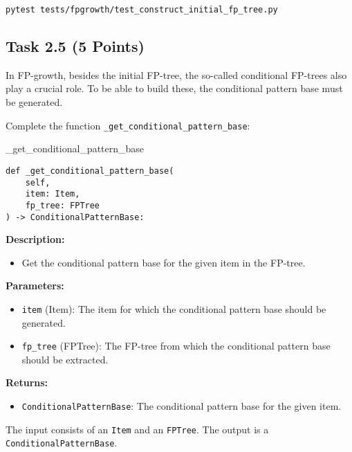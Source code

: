 \documentclass[
english,
smallborders
]{i6prcsht}
\newcommand{\points}[1]{\hfill \color{red}(#1 Points)\color{black}}
\begin{document}
\begin{lstlisting}
pytest tests/fpgrowth/test_construct_initial_fp_tree.py
\end{lstlisting}

\newpage

\subsection*{Task 2.5 \points{5}}

In FP-growth, besides the initial FP-tree, the so-called conditional FP-trees also play a crucial role. To be able to build these, the conditional pattern base must be generated.

Complete the function \texttt{\_get\_conditional\_pattern\_base}:

\vspace*{0.3cm}

\begin{functionbox}{\_get\_conditional\_pattern\_base}
	\begin{lstlisting}[numbers=none]
def _get_conditional_pattern_base(
    self, 
    item: Item, 
    fp_tree: FPTree
) -> ConditionalPatternBase:
\end{lstlisting}
	
	\textbf{Description:}
	\begin{itemize}[leftmargin=*,topsep=0pt]
		\item Get the conditional pattern base for the given item in the FP-tree.
	\end{itemize}
	
	\textbf{Parameters:}
	\begin{itemize}[leftmargin=*,topsep=0pt]
		\item \texttt{item} (Item): The item for which the conditional pattern base should be generated.
		\item \texttt{fp\_tree} (FPTree): The FP-tree from which the conditional pattern base should be extracted.
	\end{itemize}
	
	\textbf{Returns:}
	\begin{itemize}[leftmargin=*,topsep=0pt]
		\item \texttt{ConditionalPatternBase}: The conditional pattern base for the given item.
	\end{itemize}
\end{functionbox}

\vspace*{0.5cm}

The input consists of an \texttt{Item} and an \texttt{FPTree}. The output is a \texttt{ConditionalPatternBase}.
\end{document}
